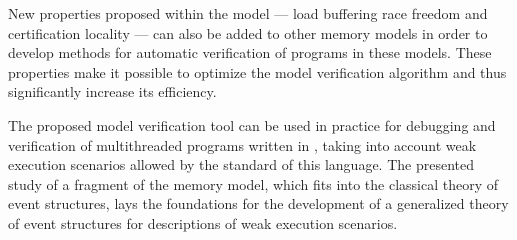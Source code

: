 
New properties proposed within the \WkmS model ---
load buffering race freedom and certification locality ---
can also be added to other memory models in order to develop methods for automatic verification of programs in these models.
These properties make it possible to optimize the model verification algorithm and thus significantly increase its efficiency.

The proposed model verification tool can be used in practice for debugging and verification of multithreaded programs written in \CLANG, taking into account weak execution scenarios allowed by the standard of this language.
The presented study of a fragment of the \Wkm memory model, which fits into the classical theory of event structures, lays the foundations for the development of a generalized theory of event structures for
descriptions of weak execution scenarios.


